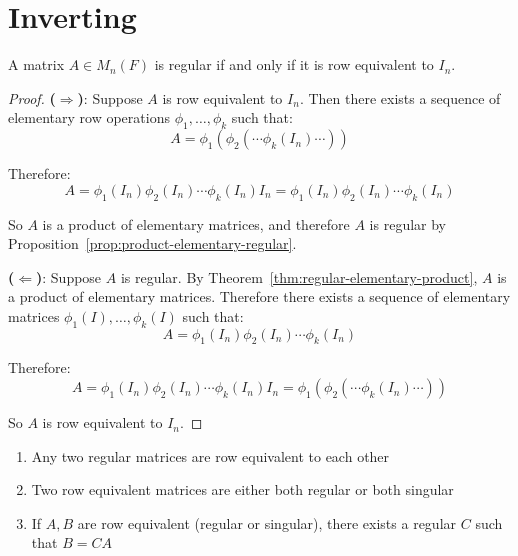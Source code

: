 \section{Inverting}
\begin{theorem}\label{thm:regular-row-equiv}
    A matrix $A \in M_n(F)$ is regular if and only if it is row equivalent to $I_n$.
\end{theorem}

\begin{proof}
    \textbf{($\Rightarrow$)}: Suppose $A$ is row equivalent to $I_n$. Then there exists a sequence of elementary row operations $\phi_1, \ldots, \phi_k$ such that:
    \[
    A = \phi_1(\phi_2(\cdots \phi_k(I_n) \cdots))
    \]
    
    Therefore:
    \[
    A = \phi_1(I_n) \phi_2(I_n) \cdots \phi_k(I_n) I_n = \phi_1(I_n) \phi_2(I_n) \cdots \phi_k(I_n)
    \]
    
    So $A$ is a product of elementary matrices, and therefore $A$ is regular by Proposition~\ref{prop:product-elementary-regular}.
    
    \textbf{($\Leftarrow$)}: Suppose $A$ is regular. By Theorem~\ref{thm:regular-elementary-product}, $A$ is a product of elementary matrices. Therefore there exists a sequence of elementary matrices $\phi_1(I), \ldots, \phi_k(I)$ such that:
    \[
    A = \phi_1(I_n) \phi_2(I_n) \cdots \phi_k(I_n)
    \]
    
    Therefore:
    \[
    A = \phi_1(I_n) \phi_2(I_n) \cdots \phi_k(I_n) I_n = \phi_1(\phi_2(\cdots \phi_k(I_n) \cdots))
    \]
    
    So $A$ is row equivalent to $I_n$.
\end{proof}

\begin{proposition}\label{prop:row-equiv-properties}
    \begin{enumerate}[label=(\roman*)]
        \item Any two regular matrices are row equivalent to each other
        \item Two row equivalent matrices are either both regular or both singular
        \item If $A, B$ are row equivalent (regular or singular), there exists a regular $C$ such that $B = CA$
    \end{enumerate}
\end{proposition}

